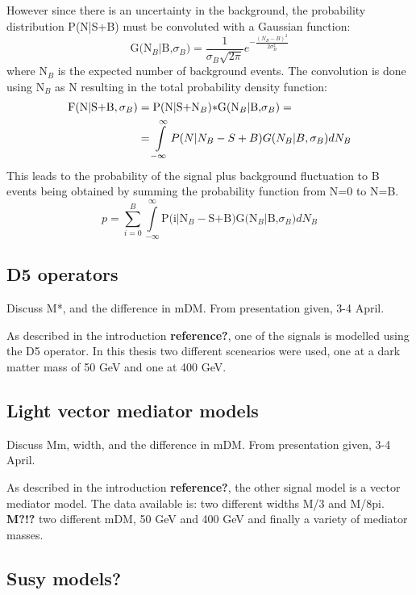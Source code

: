 However since there is an uncertainty in the background, the probability distribution P(N|S+B) must be convoluted with a Gaussian function:
\begin{equation}
 \text{G(N$_B$|B,$\sigma_B$)}=\frac{1}{\sigma_B \sqrt{2 \pi}} e^{-\frac{(N_B-B)^2}{2\sigma_B^2}}
\end{equation}
where N$_B$ is the expected number of background events. The convolution is done using N$_B$ as N resulting in the total probability density function:
\begin{align}
\text{F(N|S+B},\sigma_B) &= \text{P(N|S+N$_B$)$\ast$G(N$_B$|B,$\sigma_B$)}= \notag \\
&=\int\limits_{-\infty}^{\infty}P(N|N_B - S+B)G(N_B|B,\sigma_B) dN_B
\end{align}
This leads to the probability of the signal plus background fluctuation to B events being obtained by summing the probability function from N=0 to N=B.
\begin{equation}
p = \sum\limits_{i=0}^{B} \int\limits_{-\infty}^{\infty} \text{P(i|N$_B - $S+B)G(N$_B$|B,$\sigma_B$)} dN_B
\end{equation}



\subsection{D5 operators}
Discuss M*, and the difference in mDM. From presentation given, 3-4 April. 

As described in the introduction \textbf{reference?}, one of the signals is modelled using the D5 operator. In this thesis two different scenearios were used, one at a dark matter mass of 50 GeV and one at 400 GeV.

\subsection{Light vector mediator models}
Discuss Mm, width, and the difference in mDM. From presentation given, 3-4 April.

As described in the introduction \textbf{reference?}, the other signal model is a vector mediator model. The data available is: two different widths M/3 and M/8pi. \textbf{M?!?}
two different mDM, 50 GeV and 400 GeV and finally a variety of mediator masses. 

\subsection{Susy models?}
